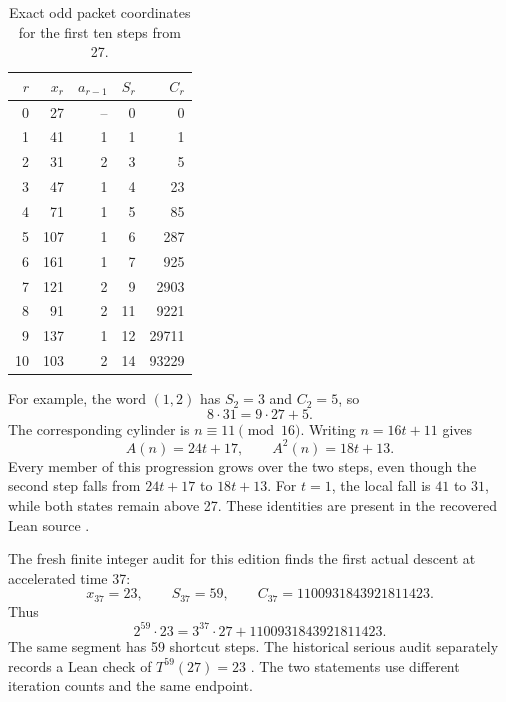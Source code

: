 \begin{table}[htbp]\centering
\caption{Exact odd packet coordinates for the first ten steps from 27.}\label{tab:27}
\begin{tabular}{rrrrr}\toprule
$r$&$x_r$&$a_{r-1}$&$S_r$&$C_r$\\\midrule
0&27&--&0&0\\
1&41&1&1&1\\
2&31&2&3&5\\
3&47&1&4&23\\
4&71&1&5&85\\
5&107&1&6&287\\
6&161&1&7&925\\
7&121&2&9&2903\\
8&91&2&11&9221\\
9&137&1&12&29711\\
10&103&2&14&93229\\\bottomrule
\end{tabular}
\end{table}

For example, the word $(1,2)$ has $S_2=3$ and $C_2=5$, so
\[
8\cdot31=9\cdot27+5.
\]
The corresponding cylinder is $n\equiv11\pmod{16}$. Writing $n=16t+11$ gives
\[
A(n)=24t+17,\qquad A^2(n)=18t+13.
\]
Every member of this progression grows over the two steps, even though the second step falls from $24t+17$ to $18t+13$. For $t=1$, the local fall is $41$ to $31$, while both states remain above 27. These identities are present in the recovered Lean source \cite{projectcollatzcore}.

The fresh finite integer audit for this edition finds the first actual descent at accelerated time 37:
\begin{equation}\label{eq:27descent}
x_{37}=23,\qquad S_{37}=59,\qquad
C_{37}=1100931843921811423.
\end{equation}
Thus
\[
2^{59}\cdot23=3^{37}\cdot27+1100931843921811423.
\]
The same segment has 59 shortcut steps. The historical serious audit separately records a Lean check of $T^{59}(27)=23$ \cite{projectcollatzaudit}. The two statements use different iteration counts and the same endpoint.


